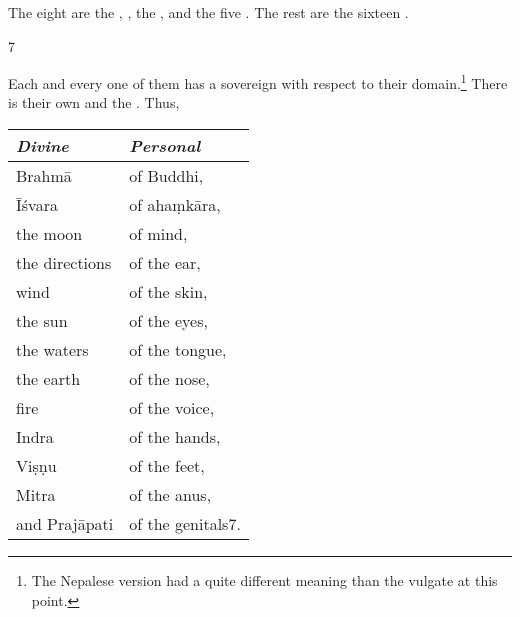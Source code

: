 \begin{translation}
The eight  are 
the ,
, 
the , 
and the five .
The rest are the sixteen .
    
\item[7]   

Each and every one of them has a sovereign with respect to their
domain.\footnote{The Nepalese version had a quite different meaning
    than the vulgate at this point.}  There is their own
     and the .
    Thus, \\
\begin{center}
\begin{tabular}{ll}
\toprule
\emph{Divine} & \emph{Personal}\\
\midrule
Brahmā & of Buddhi,\\
Īśvara &of ahaṃkāra,\\
the moon &of mind,\\
the directions &of the ear,\\
wind &of the skin,\\
the sun & of the eyes,\\
the waters &of the tongue,\\
the earth &of the nose,\\
fire &of the voice,\\
Indra & of the hands,\\
Viṣṇu &of the feet,\\
Mitra & of the anus,\\
and Prajāpati &of the genitals7.\\
\bottomrule
\end{tabular}
\end{center}









\end{translation}
